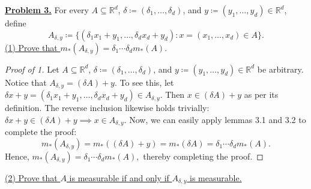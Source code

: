 \noindent \underline{\textbf{Problem 3.}} For every \( A \subseteq \mathbb{R}^{d}  \), \( \delta \coloneqq (\delta_1, \hdots , \delta_d) \), and \( y \coloneqq (y_1, \hdots , y_d ) \in \mathbb{R}^{d} \), define \[A_{\delta ,y} \coloneqq \{ (\delta_1 x_1 + y_1, \hdots , \delta_d x_d + y_d ) : x = (x_1, \hdots , x_d) \in A\}. \]
\underline{(1) Prove that \( m_*(A_{\delta ,y} ) = \delta_1\cdots \delta _d m_*(A). \) }
\begin{proof}[Proof of 1]
Let \( A \subseteq \mathbb{R}^{d}  \),  \( \delta \coloneqq (\delta_1, \hdots , \delta_d) \), and \( y \coloneqq (y_1, \hdots , y_d ) \in \mathbb{R}^{d} \) be arbitrary. Notice that \( A_{\delta ,y} = (\delta A) + y  \). To see this, let \( \delta x + y = (\delta_1 x_1 + y_1, \hdots , \delta_d x_d + y_d) \in A_{\delta ,y}  \). Then \( x \in (\delta A) + y\) as per its definition. The reverse inclusion likewise holds trivially: \(\delta x + y \in (\delta A) + y \implies x \in A_{\delta ,y} \). Now, we can easily apply lemmas 3.1 and 3.2 to complete the proof: \[m_*(A_{\delta ,y}) = m_*((\delta A) + y) = m_*(\delta A) = \delta_1\cdots \delta_d m_*(A).  \] Hence, \( m_*(A_{\delta ,y} ) = \delta_1\cdots \delta_d m_*(A),  \) thereby completing the proof.
\end{proof}
\noindent \underline{(2) Prove that $A$ is measurable if and only if $A_{\delta, y}$ is measurable.}

